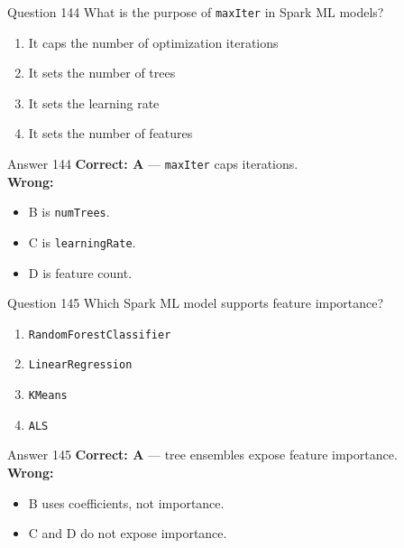 \documentclass[aspectratio=169,11pt]{beamer}
\begin{document}
	\begin{frame}{Question 144}
		What is the purpose of \texttt{maxIter} in Spark ML models?
		\begin{enumerate}[label=\Alph*.]
			\item It caps the number of optimization iterations
			\item It sets the number of trees
			\item It sets the learning rate
			\item It sets the number of features
		\end{enumerate}
	\end{frame}
	\begin{frame}{Answer 144}
		\textbf{Correct: A} --- \texttt{maxIter} caps iterations.\\
		\vspace{0.5em}
		\textbf{Wrong:}
		\begin{itemize}
			\item B is \texttt{numTrees}.
			\item C is \texttt{learningRate}.
			\item D is feature count.
		\end{itemize}
	\end{frame}
	
	\begin{frame}{Question 145}
		Which Spark ML model supports feature importance?
		\begin{enumerate}[label=\Alph*.]
			\item \texttt{RandomForestClassifier}
			\item \texttt{LinearRegression}
			\item \texttt{KMeans}
			\item \texttt{ALS}
		\end{enumerate}
	\end{frame}
	\begin{frame}{Answer 145}
		\textbf{Correct: A} --- tree ensembles expose feature importance.\\
		\vspace{0.5em}
		\textbf{Wrong:}
		\begin{itemize}
			\item B uses coefficients, not importance.
			\item C and D do not expose importance.
		\end{itemize}
	\end{frame}
	
\end{document}
